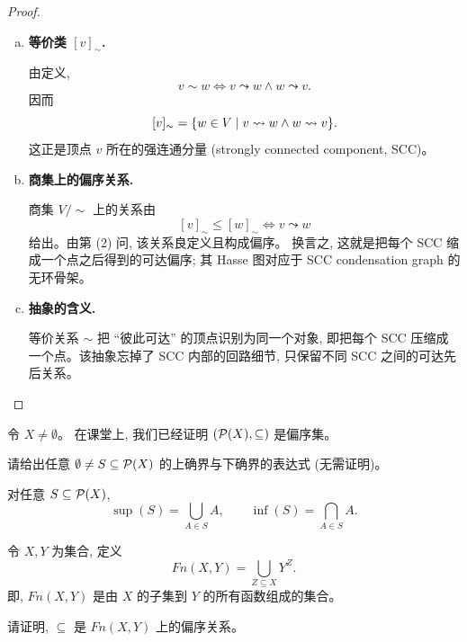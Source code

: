\begin{proof}
\begin{enumerate}[(1)]
\begin{enumerate}[(a)]
          因而 $\leadsto$ 是拟序。

        \item \textbf{等价类 $[v]_{\sim}$.}

          由定义,
          \[
            v \sim w
            \iff v \leadsto w \land w \leadsto v.
          \]
          因而
          \[
            [v]_{\sim} = \{w \in V \mid v \leadsto w \land w \leadsto v\}.
          \]
          这正是顶点 $v$ 所在的强连通分量 (strongly connected component, SCC)。

        \item \textbf{商集上的偏序关系.}

          商集 $V/\sim$ 上的关系由
          \[
            [v]_{\sim} \le [w]_{\sim}
            \iff v \leadsto w
          \]
          给出。由第 (2) 问, 该关系良定义且构成偏序。
          换言之, 这就是把每个 SCC 缩成一个点之后得到的可达偏序;
          其 Hasse 图对应于 SCC condensation graph 的无环骨架。

        \item \textbf{抽象的含义.}

          等价关系 $\sim$ 把 ``彼此可达'' 的顶点识别为同一个对象, 即把每个 SCC 压缩成一个点。该抽象忘掉了 SCC 内部的回路细节, 只保留不同 SCC 之间的可达先后关系。
      \end{enumerate}
  \end{enumerate}
\end{proof}

\begin{problem}
  令 $X \neq \emptyset$。
  在课堂上, 我们已经证明 $(\mathcal{P}(X), \subseteq)$ 是偏序集。

  \noindent 请给出任意 $\emptyset \neq S \subseteq \mathcal{P}(X)$ 的上确界与下确界的表达式
  (无需证明)。
\end{problem}

\begin{solution}
  对任意 $S \subseteq \mathcal{P}(X)$,
  \[
    \sup(S) = \bigcup_{A \in S} A,
    \qquad
    \inf(S) = \bigcap_{A \in S} A.
  \]
\end{solution}

\begin{problem}[偏序]
  令 $X, Y$ 为集合, 定义
  \[
    Fn(X, Y) = \bigcup_{Z \subseteq X} Y^Z.
  \]
  即, $Fn(X, Y)$ 是由 $X$ 的子集到 $Y$ 的所有函数组成的集合。

  \noindent 请证明, $\subseteq$ 是 $Fn(X, Y)$ 上的偏序关系。
\end{problem}

